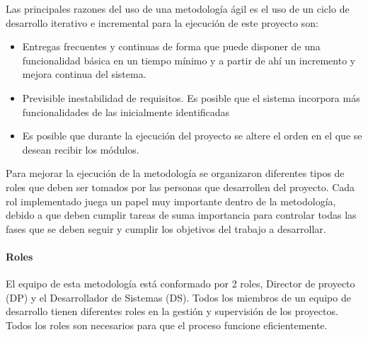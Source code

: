 Las principales razones del uso de una metodología ágil es el uso de un ciclo de desarrollo iterativo e incremental para la ejecución de este proyecto son:

\begin{itemize}
	\item Entregas frecuentes y continuas de forma que puede disponer de una funcionalidad básica en un tiempo mínimo y a partir de ahí un incremento y mejora continua del sistema.
	
	\item Previsible inestabilidad de requisitos. Es posible que el sistema incorpora más funcionalidades de las inicialmente identificadas
	
	\item Es posible que durante la ejecución del proyecto se altere el orden en el que se desean recibir los módulos.
\end{itemize} 

Para mejorar la ejecución de la metodología se organizaron diferentes tipos de roles que deben ser tomados por las personas que desarrollen del proyecto. Cada rol implementado juega un papel muy importante dentro de la metodología, debido a que deben cumplir tareas de suma importancia para controlar todas las fases que se deben seguir y cumplir los objetivos del trabajo a desarrollar.

\paragraph{Roles}

El equipo de esta metodología está conformado por 2 roles, Director de proyecto (DP) y el Desarrollador de Sistemas (DS). Todos los miembros de un equipo de desarrollo tienen diferentes roles en la gestión y supervisión de los proyectos. Todos los roles son necesarios para que el proceso funcione eficientemente. 

